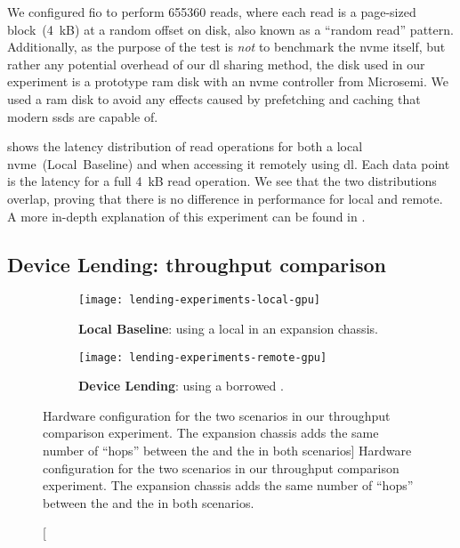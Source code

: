 We configured \gls{fio} to perform 655360 reads, where each read is a page-sized block~(4~kB) at a random offset on disk, also known as a ``random read'' pattern.
%
Additionally, as the purpose of the test is \emph{not} to benchmark the \gls{nvme} itself, but rather any potential overhead of our \gls{dl} sharing method, the disk used in our experiment is a prototype \gls{ram} disk with an \gls{nvme} controller from Microsemi.
%
We used a \gls{ram} disk to avoid any effects caused by prefetching and caching that modern \glspl{ssd} are capable of.




 shows the latency distribution of read operations for both a local \gls{nvme}~(Local~Baseline) and when accessing it remotely using \gls{dl}.
%
Each data point is the latency for a full 4~kB read operation.
%
We see that the two distributions overlap, proving that there is no difference in performance for local and remote.
%
A more in-depth explanation of this experiment can be found in .



\subsection{Device Lending: throughput comparison}\label{sec:eval-bw}
\begin{figure}
    \centering
    \begin{subfigure}{\linewidth}
        \centering
        \texttt{[image: lending-experiments-local-gpu]}
        \caption{\textbf{Local Baseline}: using a local  in an expansion chassis.}
        \label{fig:eval-lending-gpu-local}
    \end{subfigure}
    \par\vspace{10mm}
    \begin{subfigure}{\linewidth}
        \centering
        \texttt{[image: lending-experiments-remote-gpu]}
        \caption{\textbf{Device Lending}: using a borrowed .}
        \label{fig:eval-lending-gpu-remote}
    \end{subfigure}
    \par\vspace{5mm}
    \caption
    [Hardware configuration for the two scenarios in our  throughput comparison experiment. The expansion chassis adds the same number of ``hops'' between the  and the  in both scenarios]
    {Hardware configuration for the two scenarios in our  throughput comparison experiment. The expansion chassis adds the same number of ``hops'' between the  and the  in both scenarios.}
    \label{fig:eval-lending-gpu-topo}
\end{figure}


